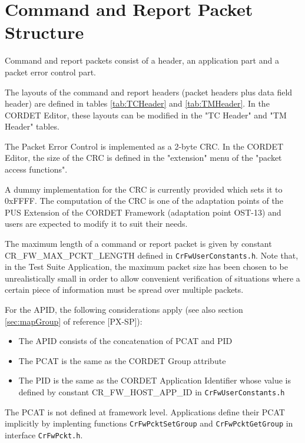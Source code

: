 \documentclass{pnp_article}
\begin{document}
\section{Command and Report Packet Structure}\label{sec:PcktStructure}
Command and report packets consist of a header, an application part and a packet error control part. 

The layouts of the command and report headers (packet headers plus data field header) are defined in tables \ref{tab:TCHeader} and \ref{tab:TMHeader}. In the CORDET Editor, these layouts can be modified in the "TC Header" and "TM Header" tables.

The Packet Error Control is implemented as a 2-byte CRC. In the CORDET Editor, the size of the CRC is defined in the "extension" menu of the "packet access functions".

A dummy implementation for the CRC is currently provided which sets it to 0xFFFF. The computation of the CRC is one of the adaptation points of the PUS Extension of the CORDET Framework (adaptation point OST-13) and users are expected to modify it to suit their needs.

The maximum length of a command or report packet is given by constant CR\_FW\_MAX\_PCKT\_LENGTH defined in \texttt{CrFwUserConstants.h}. Note that, in the Test Suite Application, the maximum packet size has been chosen to be unrealistically small in order to allow convenient verification of situations where a certain piece of information must be spread over multiple packets.

For the APID, the following considerations apply (see also section \ref{sec:mapGroup} of reference [PX-SP]):

\begin{itemize}
\item The APID consists of the concatenation of PCAT and PID
\item The PCAT is the same as the CORDET Group attribute 
\item The PID is the same as the CORDET Application Identifier whose value is defined by constant CR\_FW\_HOST\_APP\_ID in \texttt{CrFwUserConstants.h}
\end{itemize}

The PCAT is not defined at framework level. Applications define their PCAT implicitly by implenting functions \texttt{CrFwPcktSetGroup} and \texttt{CrFwPcktGetGroup} in interface \texttt{CrFwPckt.h}.
\end{document}
